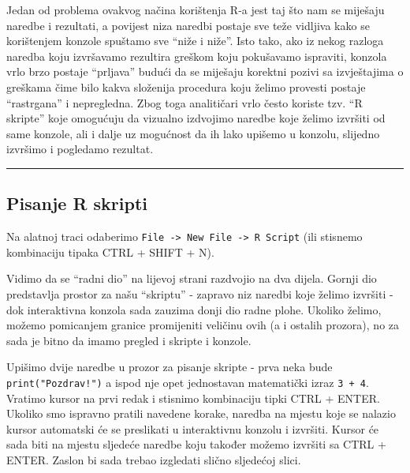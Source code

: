 \documentclass[]{book}
\theoremstyle{definition}
\theoremstyle{definition}
\theoremstyle{definition}
\theoremstyle{remark}
\begin{document}
Jedan od problema ovakvog načina korištenja R-a jest taj što nam se
miješaju naredbe i rezultati, a povijest niza naredbi postaje sve teže
vidljiva kako se korištenjem konzole spuštamo sve ``niže i niže''. Isto
tako, ako iz nekog razloga naredba koju izvršavamo rezultira greškom
koju pokušavamo ispraviti, konzola vrlo brzo postaje ``prljava'' budući
da se miješaju korektni pozivi sa izvještajima o greškama čime bilo
kakva složenija procedura koju želimo provesti postaje ``rastrgana'' i
nepregledna. Zbog toga analitičari vrlo često koriste tzv. ``R skripte''
koje omogućuju da vizualno izdvojimo naredbe koje želimo izvršiti od
same konzole, ali i dalje uz mogućnost da ih lako upišemo u konzolu,
slijedno izvršimo i pogledamo rezultat.

\begin{center}\rule{0.5\linewidth}{\linethickness}\end{center}

\subsection{Pisanje R skripti}\label{pisanje-r-skripti}

Na alatnoj traci odaberimo
\texttt{File\ -\textgreater{}\ New\ File\ -\textgreater{}\ R\ Script}
(ili stisnemo kombinaciju tipaka CTRL + SHIFT + N).

Vidimo da se ``radni dio'' na lijevoj strani razdvojio na dva dijela.
Gornji dio predstavlja prostor za našu ``skriptu'' - zapravo niz naredbi
koje želimo izvršiti - dok interaktivna konzola sada zauzima donji dio
radne plohe. Ukoliko želimo, možemo pomicanjem granice promijeniti
veličinu ovih (a i ostalih prozora), no za sada je bitno da imamo
pregled i skripte i konzole.

Upišimo dvije naredbe u prozor za pisanje skripte - prva neka bude
\texttt{print("Pozdrav!")} a ispod nje opet jednostavan matematički
izraz \texttt{3\ +\ 4}. Vratimo kursor na prvi redak i stisnimo
kombinaciju tipki CTRL + ENTER. Ukoliko smo ispravno pratili navedene
korake, naredba na mjestu koje se nalazio kursor automatski će se
preslikati u interaktivnu konzolu i izvršiti. Kursor će sada biti na
mjestu sljedeće naredbe koju također možemo izvršiti sa CTRL + ENTER.
Zaslon bi sada trebao izgledati slično sljedećoj slici.
\end{document}
